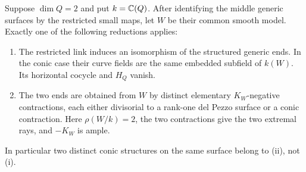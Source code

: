 \begin{lemma}\label{sl:generic-dichotomy}
Suppose $\dim Q=2$ and put $k=\mathbb C(Q)$.
After identifying the middle generic surfaces by the restricted small
maps, let $W$ be their common smooth model.  Exactly one of the following
reductions applies:
\begin{enumerate}[label=\textup{(\roman*)}]
\item The restricted link induces an isomorphism of the structured
generic ends.  In the conic case their curve fields are the same
embedded subfield of $k(W)$.  Its horizontal cocycle and $H_Q$ vanish.
\item The two ends are obtained from $W$ by distinct elementary
$K_W$-negative contractions, each either divisorial to a rank-one del
Pezzo surface or a conic contraction.  Here $\rho(W/k)=2$, the two
contractions give the two extremal rays, and $-K_W$ is ample.
\end{enumerate}
In particular two distinct conic structures on the same surface belong
to \textup{(ii)}, not \textup{(i)}.
\end{lemma}

